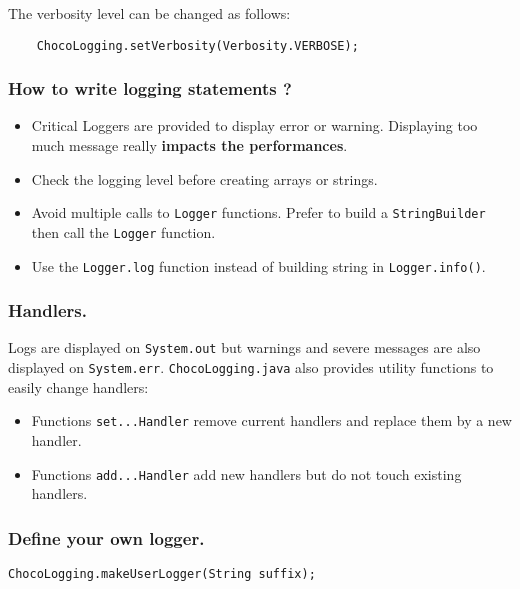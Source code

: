 The verbosity level can be changed as follows:
\begin{lstlisting}
	ChocoLogging.setVerbosity(Verbosity.VERBOSE);
\end{lstlisting}

\subsubsection{How to write logging statements ?}\label{advanced:howtowriteloggingstatements}\hypertarget{advanced:howtowriteloggingstatements}{}

\begin{itemize}
	\item Critical Loggers are provided to display error or warning. Displaying too much message really \textbf{impacts the performances}.
	\item Check the logging level before creating arrays or strings.
	\item Avoid multiple calls to \texttt{Logger} functions. Prefer to build a \texttt{StringBuilder} then call the \texttt{Logger} function.
	\item Use the \texttt{Logger.log} function instead of building string in \texttt{Logger.info()}.
\end{itemize}

\subsubsection{Handlers.}\label{advanced:handlers}\hypertarget{advanced:handlers}{}
Logs are displayed on \texttt{System.out} but warnings and severe messages are also displayed on \texttt{System.err}.
\texttt{ChocoLogging.java} also provides utility functions to easily change handlers:
\begin{itemize}
	\item Functions \texttt{set...Handler} remove current handlers and replace them by a new handler.
	\item Functions \texttt{add...Handler} add new handlers but do not touch existing handlers.
\end{itemize}

\subsubsection{Define your own logger.}\label{advanced:defineyourownlogger}\hypertarget{advanced:defineyourownlogger}{}
\begin{lstlisting}
ChocoLogging.makeUserLogger(String suffix);
\end{lstlisting}

